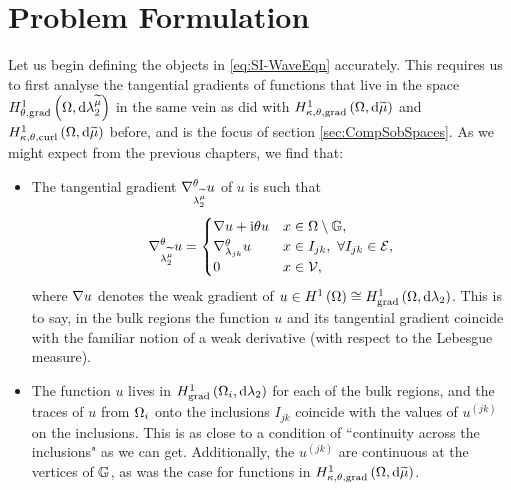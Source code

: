 \section{Problem Formulation} \label{sec:SI-ProblemFormulation}
Let us begin defining the objects in \eqref{eq:SI-WaveEqn} accurately.
This requires us to first analyse the tangential gradients of functions that live in the space $H^1_{\theta, \mathrm{grad}}\left( \Omega, \mathrm{d}\lambda_2^{\widetilde{\mu}} \right)$ in the same vein as did with $H^1_{\kappa,\theta,\mathrm{grad}}\left( \Omega, \mathrm{d}\widetilde{\mu} \right)$ and $H^1_{\kappa,\theta,\mathrm{curl}}\left( \Omega, \mathrm{d}\widetilde{\mu} \right)$ before, and is the focus of section \ref{sec:CompSobSpaces}.
As we might expect from the previous chapters, we find that:
\begin{itemize}
	\item The tangential gradient $\nabla^{\theta}_{\lambda_2^{\widetilde{\mu}}}u$ of $u$ is such that
	\begin{align*}
		\nabla^{\theta}_{\lambda_2^{\widetilde{\mu}}}u = 
		\begin{cases} 
			\nabla u + \mathrm{i}\theta u & x\in\Omega\setminus\mathbb{G}, \\ 
			\nabla^{\theta}_{\lambda_{jk}}u & x\in I_{jk}, \ \forall I_{jk}\in\mathcal{E}, \\
			0 & x\in\mathcal{V},			
		\end{cases}
	\end{align*}
	where $\nabla u$ denotes the weak gradient of $u\in H^1\left( \Omega \right)\cong H^1_\mathrm{grad}\left( \Omega, \mathrm{d}\lambda_2 \right)$.
	This is to say, in the bulk regions the function $u$ and its tangential gradient coincide with the familiar notion of a weak derivative (with respect to the Lebesgue measure).
	\item The function $u$ lives in $H^1_\mathrm{grad}\left( \Omega_i, \mathrm{d}\lambda_2 \right)$ for each of the bulk regions, and the traces of $u$ from $\Omega_i$ onto the inclusions $I_{jk}$ coincide with the values of $u^{(jk)}$ on the inclusions.
	This is as close to a condition of ``continuity across the inclusions" as we can get.
	Additionally, the $u^{(jk)}$ are continuous at the vertices of $\mathbb{G}$, as was the case for functions in $H^1_{\kappa,\theta,\mathrm{grad}}\left( \Omega, \mathrm{d}\widetilde{\mu} \right)$.
\end{itemize}

